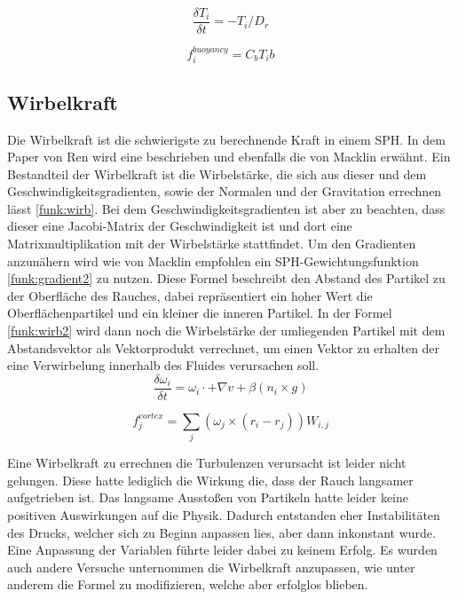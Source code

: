 \documentclass[intern,palatino]{cgBA}
\begin{document}
\begin{equation}\label{funk:temp2}
\frac{\delta T_i}{\delta t}  = - T_i/D_r
\end{equation}

\begin{equation}\label{funk:temp3}
f^{buoyancy}_i  = C_b T_i b
\end{equation}


\subsection{Wirbelkraft}\label{wirbel}

Die Wirbelkraft ist die schwierigste zu berechnende Kraft in einem SPH. In dem Paper von Ren \cite{ren2016fast} wird eine beschrieben und ebenfalls die von Macklin \cite{macklin2014unified} erwähnt.
\newline
Ein Bestandteil der Wirbelkraft ist die Wirbelstärke, die sich aus dieser und dem Geschwindigkeitsgradienten, sowie der Normalen und der Gravitation errechnen lässt \ref{funk:wirb}. Bei dem Geschwindigkeitsgradienten ist aber zu beachten, dass dieser eine Jacobi-Matrix der Geschwindigkeit ist und dort eine Matrixmultiplikation mit der Wirbelstärke stattfindet. Um den Gradienten anzunähern wird wie von Macklin \cite{macklin2014unified} empfohlen ein SPH-Gewichtungsfunktion \ref{funk:gradient2} zu nutzen. Diese Formel beschreibt den Abstand des Partikel zu der Oberfläche des Rauches, dabei repräsentiert ein hoher Wert die Oberflächenpartikel und ein kleiner die inneren Partikel.
In der Formel \ref{funk:wirb2} wird dann noch die Wirbelstärke der umliegenden Partikel mit dem Abstandsvektor als Vektorprodukt verrechnet, um einen Vektor zu erhalten der eine Verwirbelung innerhalb des Fluides verursachen soll.  
\begin{equation}\label{funk:wirb}
\frac{\delta \omega_i}{\delta t}  = \omega_i \cdot + \nabla v + \beta(n_i \times g)
\end{equation}

\begin{equation}\label{funk:wirb2}
f^{vortex}_j  = \sum_j (\omega_j \times (r_i -r_j)) W_{i,j}
\end{equation}

Eine Wirbelkraft zu errechnen die Turbulenzen verursacht ist leider nicht gelungen. Diese hatte lediglich die Wirkung die, dass der Rauch langsamer aufgetrieben ist. Das langsame Ausstoßen von Partikeln hatte leider keine positiven Auswirkungen auf die Physik. Dadurch entstanden eher Instabilitäten des Drucks, welcher sich zu Beginn anpassen lies, aber dann inkonstant wurde. Eine Anpassung der Variablen führte leider dabei zu keinem Erfolg. Es wurden auch andere Versuche unternommen die Wirbelkraft anzupassen, wie unter anderem die Formel zu modifizieren, welche aber erfolglos blieben.
\end{document}
